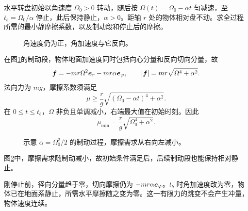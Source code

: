 \begin{exercise}[转盘制动时的摩擦需求]\label{rot:problem-exercise-6}\label{rot:ex:d6-h6}
水平转盘初始以角速度 $\Omega_0>0$ 转动，随后按 $\Omega(t)=\Omega_0-\alpha t$ 匀减速，至 $t_b=\Omega_0/\alpha$ 停止，此后保持静止，$\alpha>0$。距轴 $r$ 处的物体相对盘不动。求全过程所需的最小静摩擦系数，以及制动段和停止后的摩擦。
\end{exercise}
\begin{figure}[H]\centering
{}
\caption{角速度仍为正，角加速度与它反向。}\label{rot:fig:d6-h6-q}
\end{figure}
\begin{solution}
在图\ref{rot:fig:d6-h6-q}的制动段，物体地面加速度同时包括向心分量和反向切向分量，故
\[
\bm{f}=-mr\Omega^2\bm{e}_r-mr\alpha\bm{e}_\varphi,
\qquad |\bm{f}|=mr\sqrt{\Omega^4+\alpha^2}.
\]
法向力为 $mg$，摩擦系数须满足
\[
\mu\ge\frac rg\sqrt{(\Omega_0-\alpha t)^4+\alpha^2}.
\]
在 $0\le t\le t_b$，$\Omega$ 非负且单调减小，右端最大值在初始时刻。因此
\[
\boxed{\mu_{\min}=\frac rg\sqrt{\Omega_0^4+\alpha^2}.}
\]
\begin{figure}[H]\centering
{}
\caption{示意 $\alpha=\Omega_0^2/2$ 的制动过程，摩擦需求从右向左减小。}\label{rot:fig:d6-h6-s}
\end{figure}
图\ref{rot:fig:d6-h6-s}中，摩擦需求随制动减小，故初始条件满足后，后续制动段也能保持相对静止。

刚停止前，径向分量趋于零，切向摩擦仍为 $-mr\alpha\bm{e}_\varphi$。$t_b$ 时角加速度改为零，物体已在地面系静止，所需水平摩擦随之变为零。这一有限力的跳变不会产生冲量，物体速度连续。
\end{solution}


